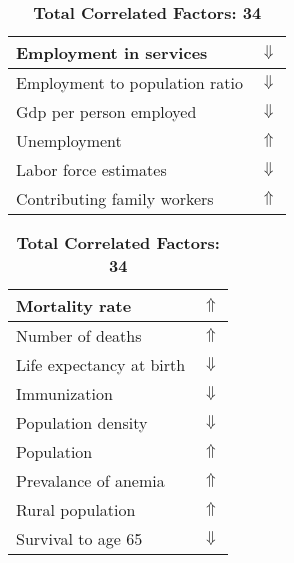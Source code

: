 \documentclass[12pt,notitlepage,oneside]{report}
\begin{document}
\begin{table}[!htb]
\begin{tabular}{|l|l|}
Employment in services & $\Downarrow$\\ \hline
Employment to population ratio & $\Downarrow$\\ \hline
Gdp per person employed & $\Downarrow$\\ \hline
Unemployment & $\Uparrow$\\ \hline
Labor force estimates & $\Downarrow$\\ \hline
Contributing family workers & $\Uparrow$\\ \hline
\end{tabular}
\begin{tabular}{|l|l|}
\hline
Mortality rate & $\Uparrow$\\ \hline
Number of deaths & $\Uparrow$\\ \hline
Life expectancy at birth & $\Downarrow$\\ \hline
Immunization & $\Downarrow$\\ \hline
Population density & $\Downarrow$\\ \hline
Population & $\Uparrow$\\ \hline
Prevalance of anemia & $\Uparrow$\\ \hline
Rural population & $\Uparrow$\\ \hline
Survival to age 65 & $\Downarrow$\\ \hline
\end{tabular}
\caption*{\textbf{Total Correlated Factors: 34}}
\end{table}
\clearpage
\end{document}
